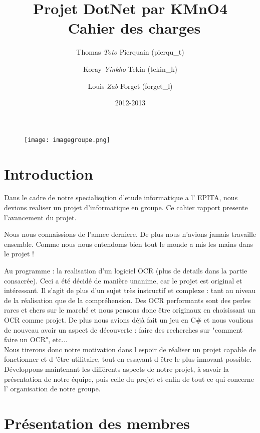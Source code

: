 \documentclass{article}
\title{Projet DotNet par KMnO4\\~Cahier des charges}
\date{2012-2013}
\author{
    Thomas \textit{Toto} Pierquain (pierqu\_t) \and
    Koray \textit{Yinkho} Tekin (tekin\_k) \and
    Louis \textit{Zab} Forget (forget\_l) \and
     }
\begin{document}
\maketitle

\begin{figure}[hp]
	\centering
    \texttt{[image: imagegroupe.png]}
	 \label{fig:Groupe KMnO4}
\end{figure}

\newpage
\tableofcontents
\newpage

\section{Introduction}
Dans le cadre de notre specialisqtion d'etude informatique a l' EPITA, nous devions realiser un projet d'informatique en groupe. Ce cahier rapport presente l'avancement du projet. 

Nous nous connaissions de l'annee derniere. De plus nous n'avions jamais travaille ensemble. Comme nous nous entendoms bien tout le monde a mis les mains dans le projet ! 

Au programme : la realisation d'un logiciel OCR (plus de details dans la partie
consacrée). Ceci a été décidé de manière unanime, car le projet est original et intéressant.
Il s'agit de plus d'un sujet très instructif et complexe : tant au niveau de la réalisation
que de la compréhension. Des OCR performants sont des perles rares et chers sur
le marché et nous pensons donc être originaux en choisissant un OCR comme projet.
De plus nous avions déjà fait un jeu en C# et nous voulions de nouveau avoir un aspect
de découverte : faire des recherches sur "comment faire un OCR", etc...\\

Nous tirerons donc notre motivation dans l espoir de réaliser un projet capable de
fonctionner et d 'être utilitaire, tout en essayant d être le plus innovant possible.\\

Développons maintenant les différents aspects de notre projet, à savoir la présentation
de notre équipe, puis celle du projet et enfin de tout ce qui concerne l' organisation
de notre groupe.\\


\newpage
    \section {Présentation des membres}
\end{document}
